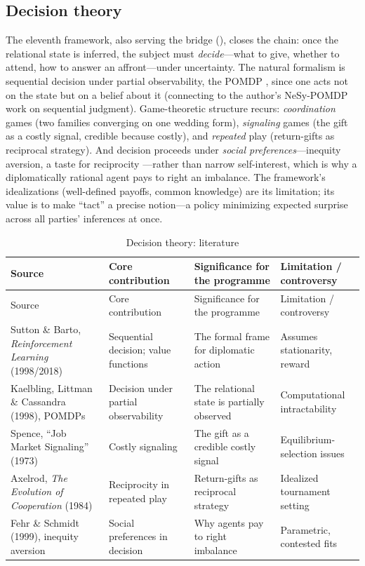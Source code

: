 \subsection{Decision theory}
The eleventh framework, also serving the bridge (), closes the chain: once the relational state is inferred, the subject must \emph{decide}---what to give, whether to attend, how to answer an affront---under uncertainty. The natural formalism is sequential decision under partial observability, the POMDP \parencite{kaelbling1998pomdp,sutton2018rl}, since one acts not on the state but on a belief about it (connecting to the author's NeSy-POMDP work on sequential judgment). Game-theoretic structure recurs: \emph{coordination} games (two families converging on one wedding form), \emph{signaling} games \parencite{spence1973,zahavi1975} (the gift as a costly signal, credible because costly), and \emph{repeated} play \parencite{axelrod1984} (return-gifts as reciprocal strategy). And decision proceeds under \emph{social preferences}---inequity aversion, a taste for reciprocity \parencite{fehr1999}---rather than narrow self-interest, which is why a diplomatically rational agent pays to right an imbalance. The framework's idealizations (well-defined payoffs, common knowledge) are its limitation; its value is to make ``tact'' a precise notion---a policy minimizing expected surprise across all parties' inferences at once.

\goldrule
\footnotesize
\begin{longtable}{Y Y Y Y}
\caption{Decision theory: literature}\label{p07:tab:lit-decision}\\
\toprule
{}
Source & Core contribution & Significance for the programme & Limitation / controversy \\
\midrule
\endfirsthead
{}
Source & Core contribution & Significance for the programme & Limitation / controversy \\
\midrule
\endhead
Sutton \& Barto, \emph{Reinforcement Learning} (1998/2018) & Sequential decision; value functions & The formal frame for diplomatic action & Assumes stationarity, reward \\
Kaelbling, Littman \& Cassandra (1998), POMDPs & Decision under partial observability & The relational state is partially observed & Computational intractability \\
Spence, ``Job Market Signaling'' (1973) & Costly signaling & The gift as a credible costly signal & Equilibrium-selection issues \\
Axelrod, \emph{The Evolution of Cooperation} (1984) & Reciprocity in repeated play & Return-gifts as reciprocal strategy & Idealized tournament setting \\
Fehr \& Schmidt (1999), inequity aversion & Social preferences in decision & Why agents pay to right imbalance & Parametric, contested fits \\
\bottomrule
\end{longtable}

